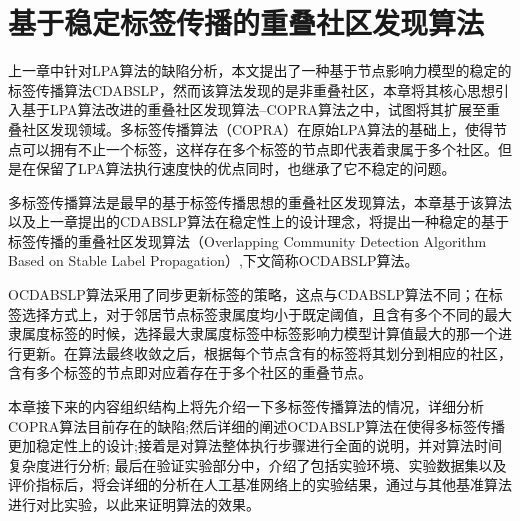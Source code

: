 \chapter{基于稳定标签传播的重叠社区发现算法}

上一章中针对LPA算法的缺陷分析，本文提出了一种基于节点影响力模型的稳定的标签传播算法CDABSLP，然而该算法发现的是非重叠社区，本章将其核心思想引入基于LPA算法改进的重叠社区发现算法--COPRA算法\cite{Gregory2009Finding}之中，试图将其扩展至重叠社区发现领域。多标签传播算法（COPRA）在原始LPA算法的基础上，使得节点可以拥有不止一个标签，这样存在多个标签的节点即代表着隶属于多个社区。但是在保留了LPA算法执行速度快的优点同时，也继承了它不稳定的问题。

多标签传播算法是最早的基于标签传播思想的重叠社区发现算法，本章基于该算法以及上一章提出的CDABSLP算法在稳定性上的设计理念，将提出一种稳定的基于标签传播的重叠社区发现算法（Overlapping Community Detection Algorithm Based on Stable Label Propagation）,下文简称OCDABSLP算法。

OCDABSLP算法采用了同步更新标签的策略，这点与CDABSLP算法不同；在标签选择方式上，对于邻居节点标签隶属度均小于既定阈值，且含有多个不同的最大隶属度标签的时候，选择最大隶属度标签中标签影响力模型计算值最大的那一个进行更新。在算法最终收敛之后，根据每个节点含有的标签将其划分到相应的社区，含有多个标签的节点即对应着存在于多个社区的重叠节点。

本章接下来的内容组织结构上将先介绍一下多标签传播算法的情况，详细分析COPRA算法目前存在的缺陷;然后详细的阐述OCDABSLP算法在使得多标签传播更加稳定性上的设计;接着是对算法整体执行步骤进行全面的说明，并对算法时间复杂度进行分析; 最后在验证实验部分中，介绍了包括实验环境、实验数据集以及评价指标后，将会详细的分析在人工基准网络上的实验结果，通过与其他基准算法进行对比实验，以此来证明算法的效果。

